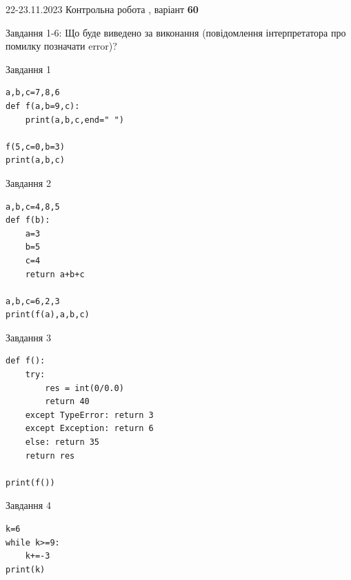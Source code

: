 \documentclass[12pt, ukrainian]{article}
\begin{document}
{{22-23.11.2023 Контрольна робота , варіант  \No \textbf { 60 }\par}}
{

Завдання 1-6: Що буде виведено за виконання (повідомлення інтерпретатора про помилку позначати error)?


\begin{minipage}[t]{9.7cm}                
{\begin{center}Завдання {1}\end{center}}
\begin{verbatim}
a,b,c=7,8,6
def f(a,b=9,c):
    print(a,b,c,end=" ")

f(5,c=0,b=3)
print(a,b,c)
\end{verbatim}     
\end{minipage}
\vline \hspace{8mm}
\begin{minipage}[t]{8.0cm}                
{\begin{center}Завдання {2}\end{center}}
\begin{verbatim}
a,b,c=4,8,5
def f(b):
    a=3
    b=5
    c=4
    return a+b+c

a,b,c=6,2,3
print(f(a),a,b,c)
\end{verbatim}     
\end{minipage}

\vspace{15mm}
\begin{minipage}[t]{9.7cm}                
{\begin{center}Завдання {3}\end{center}}
\begin{verbatim}
def f():
    try:
        res = int(0/0.0)
        return 40
    except TypeError: return 3
    except Exception: return 6
    else: return 35
    return res

print(f())
\end{verbatim}     
\end{minipage}
\vline \hspace{8mm}
\begin{minipage}[t]{8.0cm}                
{\begin{center}Завдання {4}\end{center}}
\begin{verbatim}
k=6
while k>=9:
    k+=-3
print(k)
\end{verbatim}     
\end{minipage}

}
\end{document}
